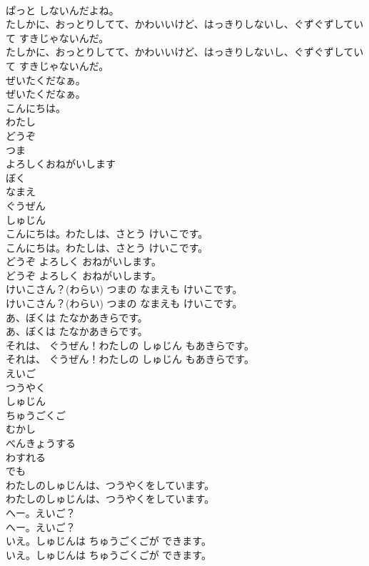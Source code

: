 \documentclass[8pt]{extreport}
\begin{document}
\begin{CJK}{UTF8}{min}
\\	ぱっと しないんだよね。 
\\	たしかに、おっとりしてて、かわいいけど、はっきりしないし、ぐずぐずしていて すきじゃないんだ。	
\\	たしかに、おっとりしてて、かわいいけど、はっきりしないし、ぐずぐずしていて すきじゃないんだ。 
\\	ぜいたくだなぁ。	
\\	ぜいたくだなぁ。 
\\	こんにちは。
\\	わたし
\\	どうぞ
\\	つま
\\	よろしくおねがいします
\\	ぼく
\\	なまえ
\\	ぐうぜん
\\	しゅじん
\\	こんにちは。わたしは、さとう けいこです。	
\\	こんにちは。わたしは、さとう けいこです。 
\\	どうぞ よろしく おねがいします。	
\\	どうぞ よろしく おねがいします。 
\\	けいこさん？(わらい) つまの なまえも けいこです。	
\\	けいこさん？(わらい) つまの なまえも けいこです。 
\\	あ、ぼくは たなかあきらです。	
\\	あ、ぼくは たなかあきらです。 
\\	それは、 ぐうぜん！わたしの しゅじん もあきらです。	
\\	それは、 ぐうぜん！わたしの しゅじん もあきらです。 
\\	えいご
\\	つうやく
\\	しゅじん
\\	ちゅうごくご
\\	むかし
\\	べんきょうする
\\	わすれる
\\	でも
\\	わたしのしゅじんは、つうやくをしています。	
\\	わたしのしゅじんは、つうやくをしています。 
\\	へー。えいご？	
\\	へー。えいご？ 
\\	いえ。しゅじんは ちゅうごくごが できます。	
\\	いえ。しゅじんは ちゅうごくごが できます。　 

\end{CJK}
\end{document}
